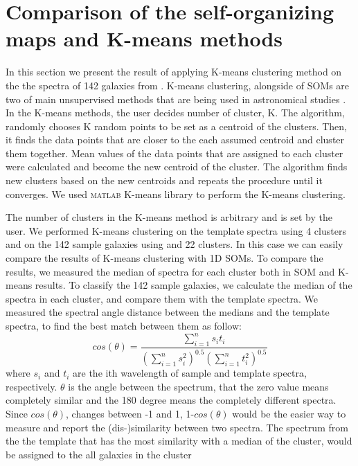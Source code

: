 \newpage



\section{Comparison of the self-organizing maps and K-means methods}
\label{app: high_Z_1d_k-means}


In this section we present the result of applying  K-means clustering method on the the spectra of 142 galaxies from .
K-means clustering, alongside of SOMs are two of main unsupervised methods that are being used in astronomical studies \citep[e.g.][]{DAbrusco12, Aycha16}.
In the K-means methods, the user decides number of cluster, K. 
The algorithm, randomly chooses K random points to be set as a centroid of the clusters.
Then, it finds the data points that are closer to the each assumed centroid and cluster them together.
Mean values of the data points that are assigned to each cluster were calculated and become the new centroid of the cluster. 
The algorithm finds new clusters based on the new centroids and repeats the procedure until it converges. 
We used \textsc{matlab} K-means library to perform the K-means clustering.


The number of clusters in the K-means method is arbitrary and is set by the user.
We performed K-means clustering on the  template spectra using 4 clusters and on the  142 sample galaxies using and 22 clusters. 
In this case we can easily compare the results of K-means clustering with 1D SOMs. 
To compare the results, we measured the median of spectra for each cluster both in SOM and K-means results.
To classify the 142 sample galaxies, we calculate the median of the spectra in each cluster, and compare them with the  template spectra.
We measured the spectral angle distance between the medians and the template spectra, to find the best match between them as follow:
\begin{equation}
    cos(\theta) = \frac{\sum_{i=1}^{n} s_it_i}{(\sum_{i=1}^{n} s^2_i)^{0.5} (\sum_{i=1}^{n} t^2_i)^{0.5}}
\end{equation}
where $s_i$ and $t_i$ are the ith wavelength of sample and template spectra, respectively. 
$\theta$ is the angle between the spectrum, that the zero value means completely similar and the 180  degree means the completely different spectra. Since $cos(\theta)$, changes between -1 and 1, 1-$cos(\theta)$ would be the easier way to measure and report the (dis-)similarity between two spectra.
The spectrum from the the  template that has the most similarity with a median of the cluster, would be assigned to the all galaxies in the cluster
 

